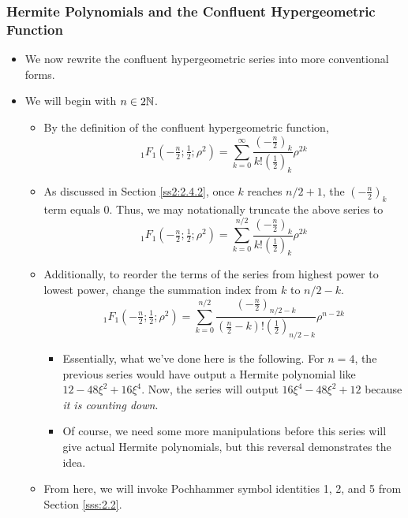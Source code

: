 \documentclass[../finalProject.tex]{subfiles}
\begin{document}
\subsubsection{Hermite Polynomials and the Confluent Hypergeometric Function}
\begin{itemize}
    \item We now rewrite the confluent hypergeometric series into more conventional forms.
    \item We will begin with $n\in 2\mathbb{N}$.
    \begin{itemize}
        \item By the definition of the confluent hypergeometric function,
        \begin{equation*}
            {}_1F_1(-\tfrac{n}{2};\tfrac{1}{2};\rho^2) = \sum_{k=0}^\infty\frac{\left( -\frac{n}{2} \right)_k}{k!\left( \frac{1}{2} \right)_k}\rho^{2k}
        \end{equation*}
        \item As discussed in Section \ref{ss2:2.4.2}, once $k$ reaches $n/2+1$, the $\left( -\frac{n}{2} \right)_k$ term equals 0. Thus, we may notationally truncate the above series to
        \begin{equation*}
            {}_1F_1(-\tfrac{n}{2};\tfrac{1}{2};\rho^2) = \sum_{k=0}^{n/2}\frac{\left( -\frac{n}{2} \right)_k}{k!\left( \frac{1}{2} \right)_k}\rho^{2k}
        \end{equation*}
        \item Additionally, to reorder the terms of the series from highest power to lowest power, change the summation index from $k$ to $n/2-k$.
        \begin{equation*}
            {}_1F_1(-\tfrac{n}{2};\tfrac{1}{2};\rho^2) = \sum_{k=0}^{n/2}\frac{\left( -\frac{n}{2} \right)_{n/2-k}}{\left( \frac{n}{2}-k \right)!\left( \frac{1}{2} \right)_{n/2-k}}\rho^{n-2k}
        \end{equation*}
        \begin{itemize}
            \item Essentially, what we've done here is the following. For $n=4$, the previous series would have output a Hermite polynomial like $12-48\xi^2+16\xi^4$. Now, the series will output $16\xi^4-48\xi^2+12$ because \emph{it is counting down}.
            \item Of course, we need some more manipulations before this series will give actual Hermite polynomials, but this reversal demonstrates the idea.
        \end{itemize}
        \item From here, we will invoke Pochhammer symbol identities 1, 2, and 5 from Section \ref{sss:2.2}.

\end{itemize}
\end{itemize}
\end{document}
